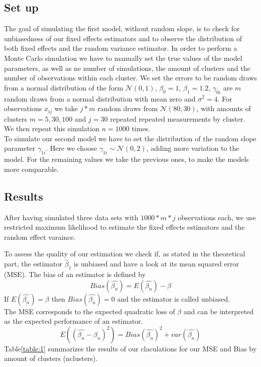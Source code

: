 \documentclass[a4paper,11pt]{article}
\begin{document}
	\subsection{Set up}
	The goal of simulating the first model, without random slope, is to check for unbiasedness of our fixed effects estimators and to observe the distribution of both fixed effects and the random variance estimator. In order to perform a Monte Carlo simulation we have to manually set the true values of the model parameters, as well as ne number of simulations, the amount of clusters and the number of observations within each cluster. We set the errors to be random draws from a normal distribution of the form $\mathcal{N}(0,1)$, $\beta_0=1$, $\beta_1=1.2$, $\gamma_{0i}$ are $m$ random draws from a normal distribution with mean zero and $\sigma^2=4$. For observations $x_{ij}$ we take $j*m$ random draws from $\mathcal{N}(80,30)$, with amounts of clusters $m={5,30,100}$ and $j=30$ repeated repeated measurements by cluster. We then repeat this simulation $n=1000$ times.
	\\
	To simulate our second model we have to set the distribution of the random slope parameter $\gamma_{1i}$. Here we choose $\gamma_{1i}\sim\mathcal{N}(0,2)$, adding more variation to the model. For the remaining values we take the previous ones, to make the models more comparable.
	\subsection{Results}
	After having simulated three data sets with $1000*m*j$ observations each, we use restricted maximum likelihood to estimate the fixed effects estimators and the random effect varaince.
	
	To assess the quality of our estimation we check if, as stated in the theoretical part, the estimator $\hat\beta_1$ is unbiased and have a look at its mean squared error (MSE). The bias of an estimator is defined by 
	\begin{equation}
		Bias(\hat{\beta_{n}})=E(\hat{\beta_n})-\beta
	\end{equation}
	If $E(\hat{\beta_n})=\beta$ then $Bias(\hat{\beta_{n}})=0$ and the estimator is called unbiased.\\
	The MSE corresponds to the expected quadratic loss of $\beta$ and can be interpreted as the expected performance of an estimator.
	\begin{equation}\label{eq:MSE}
		E((\hat{\beta_{n}}-\beta_{n})^2)=Bias(\hat{\beta_{n}})^2+var(\hat{\beta_{n}})
	\end{equation}
	Table\ref{table:1} summarizes the results of our claculations for our MSE and Bias by amount of clusters (nclusters).
	
\end{document}
